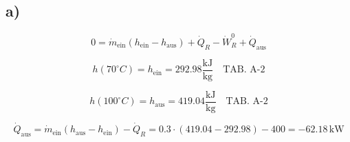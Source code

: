 

\subsection*{a)}
\begin{equation*}
0 = \dot{m}_{\text{ein}} (h_{\text{ein}} - h_{\text{aus}}) + \dot{Q}_R - \dot{W}_R^0 + \dot{Q}_{\text{aus}}
\end{equation*}

\begin{equation*}
h(70^\circ C) = h_{\text{ein}} = 292.98 \frac{\text{kJ}}{\text{kg}} \quad \text{TAB. A-2}
\end{equation*}

\begin{equation*}
h(100^\circ C) = h_{\text{aus}} = 419.04 \frac{\text{kJ}}{\text{kg}} \quad \text{TAB. A-2}
\end{equation*}

\begin{equation*}
\dot{Q}_{\text{aus}} = \dot{m}_{\text{ein}} (h_{\text{aus}} - h_{\text{ein}}) - \dot{Q}_R = 0.3 \cdot (419.04 - 292.98) - 400 = -62.18 \, \text{kW}
\end{equation*}